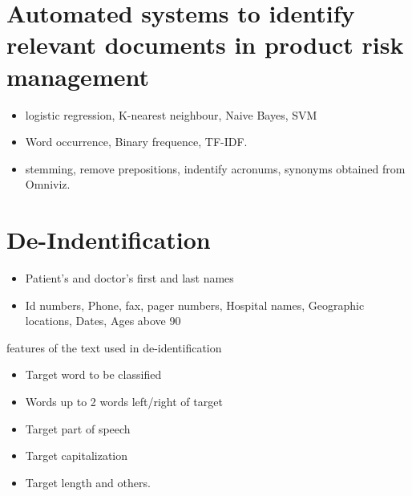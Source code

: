 \documentclass[pdftext,twoside,11pt]{article}
\begin{document}
\section{Automated systems to identify relevant
documents in product risk management}
\label{sec:intro} 
\begin{itemize}
\item  logistic regression, K-nearest neighbour, Naive Bayes, SVM
\item  Word occurrence, Binary frequence, TF-IDF. 
\item  stemming, remove prepositions, indentify acronums, synonyms obtained from Omniviz.
\end{itemize}
\section{De-Indentification}
\label{sec:intro} 
\begin{itemize}
\item  Patient's and doctor's first and last names 
\item  Id numbers, Phone, fax, pager numbers, Hospital names, Geographic locations, Dates, Ages above 90 
\end{itemize}
features of the text used in de-identification
\begin{itemize}
\item Target word to be classified
\item Words up to 2 words left/right of target
\item Target part of speech
\item Target capitalization
\item Target length and others.  
\end{itemize}
\end{document}
